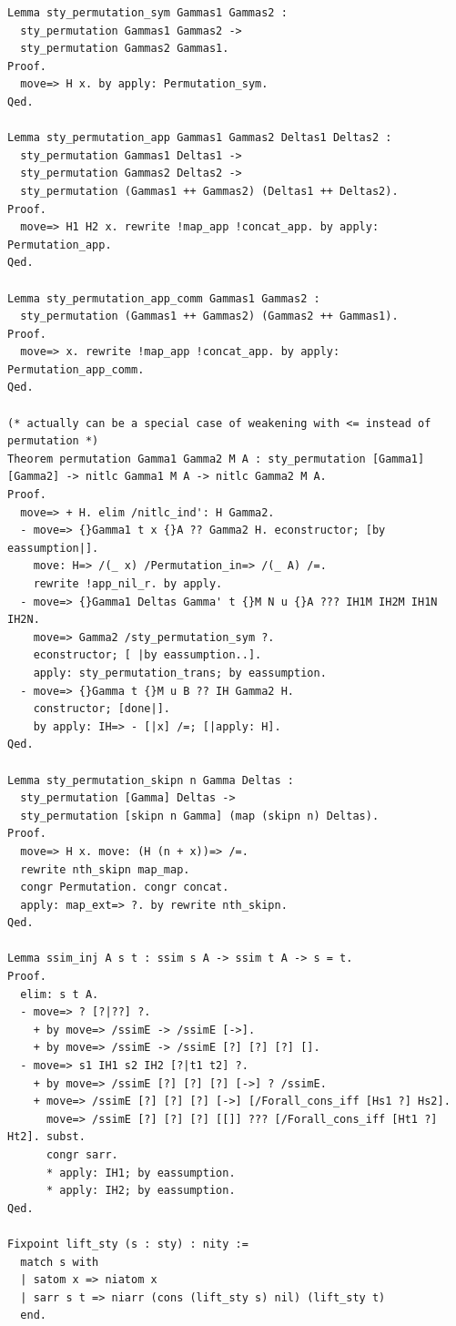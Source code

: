 \begin{lstlisting}[style=authorcoq]
Lemma sty_permutation_sym Gammas1 Gammas2 :
  sty_permutation Gammas1 Gammas2 ->
  sty_permutation Gammas2 Gammas1.
Proof.
  move=> H x. by apply: Permutation_sym.
Qed.

Lemma sty_permutation_app Gammas1 Gammas2 Deltas1 Deltas2 :
  sty_permutation Gammas1 Deltas1 ->
  sty_permutation Gammas2 Deltas2 ->
  sty_permutation (Gammas1 ++ Gammas2) (Deltas1 ++ Deltas2).
Proof.
  move=> H1 H2 x. rewrite !map_app !concat_app. by apply: Permutation_app.
Qed.

Lemma sty_permutation_app_comm Gammas1 Gammas2 :
  sty_permutation (Gammas1 ++ Gammas2) (Gammas2 ++ Gammas1).
Proof.
  move=> x. rewrite !map_app !concat_app. by apply: Permutation_app_comm.
Qed.

(* actually can be a special case of weakening with <= instead of permutation *)
Theorem permutation Gamma1 Gamma2 M A : sty_permutation [Gamma1] [Gamma2] -> nitlc Gamma1 M A -> nitlc Gamma2 M A.
Proof.
  move=> + H. elim /nitlc_ind': H Gamma2.
  - move=> {}Gamma1 t x {}A ?? Gamma2 H. econstructor; [by eassumption|].
    move: H=> /(_ x) /Permutation_in=> /(_ A) /=.
    rewrite !app_nil_r. by apply.
  - move=> {}Gamma1 Deltas Gamma' t {}M N u {}A ??? IH1M IH2M IH1N IH2N.
    move=> Gamma2 /sty_permutation_sym ?.
    econstructor; [ |by eassumption..].
    apply: sty_permutation_trans; by eassumption.
  - move=> {}Gamma t {}M u B ?? IH Gamma2 H.
    constructor; [done|].
    by apply: IH=> - [|x] /=; [|apply: H].
Qed.

Lemma sty_permutation_skipn n Gamma Deltas :
  sty_permutation [Gamma] Deltas ->
  sty_permutation [skipn n Gamma] (map (skipn n) Deltas).
Proof.
  move=> H x. move: (H (n + x))=> /=.
  rewrite nth_skipn map_map.
  congr Permutation. congr concat.
  apply: map_ext=> ?. by rewrite nth_skipn.
Qed.

Lemma ssim_inj A s t : ssim s A -> ssim t A -> s = t.
Proof.
  elim: s t A.
  - move=> ? [?|??] ?.
    + by move=> /ssimE -> /ssimE [->].
    + by move=> /ssimE -> /ssimE [?] [?] [?] [].
  - move=> s1 IH1 s2 IH2 [?|t1 t2] ?.
    + by move=> /ssimE [?] [?] [?] [->] ? /ssimE.
    + move=> /ssimE [?] [?] [?] [->] [/Forall_cons_iff [Hs1 ?] Hs2].
      move=> /ssimE [?] [?] [?] [[]] ??? [/Forall_cons_iff [Ht1 ?] Ht2]. subst.
      congr sarr.
      * apply: IH1; by eassumption.
      * apply: IH2; by eassumption.
Qed.

Fixpoint lift_sty (s : sty) : nity :=
  match s with
  | satom x => niatom x
  | sarr s t => niarr (cons (lift_sty s) nil) (lift_sty t)
  end.


\end{lstlisting}
